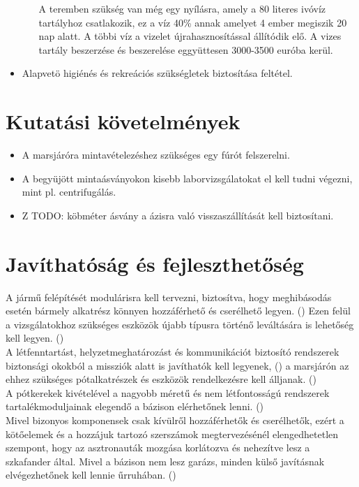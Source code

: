 \documentclass[12pt]{report}
\begin{document}
\begin{itemize}
\begin{itemize}
    A teremben szükség van még egy nyílásra, amely a 80 literes ivóvíz tartályhoz csatlakozik, ez a víz 40\% annak amelyet 4 ember megiszik 20 nap alatt. A többi víz a vizelet újrahasznosítással állítódik elő. A vizes tartály beszerzése és beszerelése eggyüttesen 3000-3500 euróba kerül.  
  \end{itemize}  
  \item Alapvetö higiénés és rekreációs szükségletek biztosítása feltétel. 
\end{itemize}
\section{Kutatási követelmények}
\begin{itemize}
  \item {} A marsjáróra mintavételezéshez szükséges egy fúrót felszerelni.
  \item {} A begyüjött mintaásványokon kisebb laborvizsgálatokat el kell tudni végezni, mint pl. centrifugálás.
  \item {} Z TODO: köbméter ásvány a ázisra való visszaszállítását kell biztosítani.
\end{itemize}


\section{Javíthatóság és fejleszthetőség}

A jármű felépítését modulárisra kell tervezni, biztosítva, hogy meghibásodás esetén bármely alkatrész könnyen hozzáférhető és cserélhető legyen. () Ezen felül a vizsgálatokhoz szükséges eszközök újabb típusra történő leváltására is lehetőség kell legyen. () \\
A létfenntartást, helyzetmeghatározást és kommunikációt biztosító rendszerek biztonsági okokból a missziók alatt is javíthatók kell legyenek, () a marsjárón az ehhez szükséges pótalkatrészek és eszközök rendelkezésre kell álljanak. () \\
A pótkerekek kivételével a nagyobb méretű és nem létfontosságú rendszerek tartalékmoduljainak elegendő a bázison elérhetőnek lenni. () \\
Mivel bizonyos komponensek csak kívülről hozzáférhetők és cserélhetők, ezért a kötőelemek és a hozzájuk tartozó szerszámok megtervezésénél elengedhetetlen szempont, hogy az asztronauták mozgása korlátozva és nehezítve lesz a szkafander által. Mivel a bázison nem lesz garázs, minden külső javításnak elvégezhetőnek kell lennie űrruhában. ()
\end{document}
